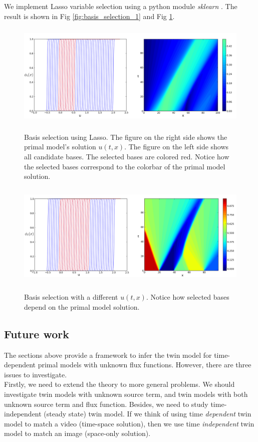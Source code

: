 \documentclass[a4paper,onecolumn]{article}
\theoremstyle{remark}
\begin{document}
\noindent We implement Lasso variable selection using a python module \emph{sklearn} \cite{sklearn}.
The result is shown in Fig \ref{fig:basis_selection_1} and Fig \ref{fig:basis_selection_2}.
\begin{figure}[H]\begin{center}
    \includegraphics[height=5cm]{all.png}
    \caption{Basis selection using Lasso. The figure on the right side shows
    the primal model's solution $u(t,x)$. The figure on the left side shows all
    candidate bases. The selected bases are colored red. Notice how the selected
    bases correspond to the colorbar of the primal model solution.}
    \label{fig:basis_selection_1}
    \includegraphics[height=5cm]{all2.png}
    \caption{Basis selection with a different $u(t,x)$. Notice
    how selected bases depend on the primal model solution.}
    \label{fig:basis_selection_2}
\end{center}
\end{figure}

\subsection{Future work}
The sections above provide a framework to infer the twin model for time-dependent primal models 
with unknown flux functions. However, there are three issues to investigate.\\

\noindent Firstly, we need to extend the theory to more general problems.
We should investigate twin models with unknown source term, and
twin models with both unknown source term and flux function.
Besides, we need to study time-independent (steady state) twin model.
If we think of using time \emph{dependent} twin model to match a video (time-space solution),
then we use time \emph{independent} twin model to match an image (space-only solution).\\
\end{document}
